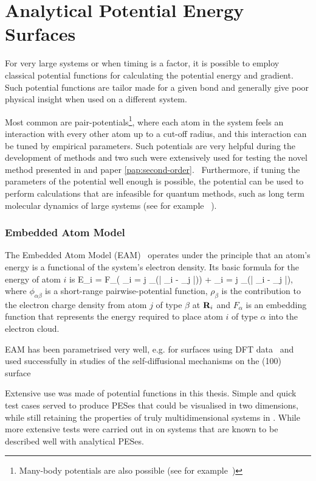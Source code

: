 \section{Analytical Potential Energy Surfaces}
\label{sec:potentials}
For very large systems or when timing is a factor, it is possible to employ classical potential functions for calculating the potential energy and gradient.
Such potential functions are tailor made for a given bond and generally give poor physical insight when used on a different system.

Most common are pair-potentials\footnote{Many-body potentials are also possible (see for example~\cite{stillinger-weber-potential})}, where each atom in the system feels an interaction with every other atom up to a cut-off radius, and this interaction can be tuned by empirical parameters.
Such potentials are very helpful during the development of methods and two such were extensively used for testing the novel method presented in  and paper \ref{pap:second-order}.~\cite{eam-1983, eam-1986, emt-1987, emt-1996}
Furthermore, if tuning the parameters of the potential well enough is possible, the potential can be used to perform calculations that are infeasible for quantum methods, such as long term molecular dynamics of large systems (see for example ~\cite{long-term-emt-2009}).

\subsubsection{Embedded Atom Model}
The Embedded Atom Model (EAM)~\cite{eam-1983} operates under the principle that an atom's energy is a functional of the system's electron density.
Its basic formula for the energy of atom $i$ is
E_i = F_\alpha \left( \sum_{i \not= j} \rho_\beta(\left| \vR_i - \vR_j \right|)\right) +  \sum_{i \not= j}   \phi_{\alpha\beta}(\left| \vR_i - \vR_j \right|),
\eeq
where $\phi_{\alpha\beta}$ is a short-range pairwise-potential function, $\rho_\beta$ is the contribution to the electron charge density from atom $j$ of type $\beta$ at ${\mathrm{\mathbf{\bm{R}}}}_i$ and $F_\alpha$ is an embedding function that represents the energy required to place atom $i$ of type $\alpha$ into the electron cloud.

EAM has been parametrised very well, e.g. for  surfaces using DFT data~\cite{eam-1986} and used successfully in studies of the self-diffusional mechanisms on the (100) surface~\cite{dimer-original-1999}

Extensive use was made of potential functions in this thesis.
Simple and quick test cases served to produce PESes that could be visualised in two dimensions, while still retaining the properties of truly multidimensional systems in .
While more extensive tests were carried out in  on systems that are known to be described well with analytical PESes.

